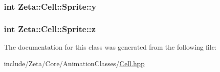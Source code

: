 \hypertarget{classZeta_1_1Cell_1_1Sprite_afccf05d1dfa7d34ee26386c2435d1013}{
\subsubsection[{y}]{\setlength{\rightskip}{0pt plus 5cm}int Zeta\+::\+Cell\+::\+Sprite\+::y\hspace{0.3cm}{\ttfamily [protected]}}}\label{classZeta_1_1Cell_1_1Sprite_afccf05d1dfa7d34ee26386c2435d1013}
\hypertarget{classZeta_1_1Cell_1_1Sprite_adef754042fa2f27edabeffe9342a66b5}{
\subsubsection[{z}]{\setlength{\rightskip}{0pt plus 5cm}int Zeta\+::\+Cell\+::\+Sprite\+::z\hspace{0.3cm}{\ttfamily [protected]}}}\label{classZeta_1_1Cell_1_1Sprite_adef754042fa2f27edabeffe9342a66b5}


The documentation for this class was generated from the following file\+:\begin{DoxyCompactItemize}
\item 
include/\+Zeta/\+Core/\+Animation\+Classes/\hyperlink{Cell_8hpp}{Cell.\+hpp}\end{DoxyCompactItemize}

